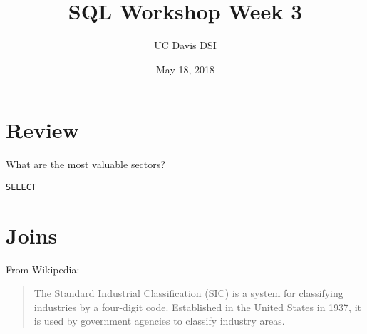 \documentclass[10pt]{exam}
\begin{document}
 
\title{SQL Workshop Week 3}
\author{UC Davis DSI}
\date{May 18, 2018}

\maketitle

\section{Review}

\begin{questions}

\question What are the most valuable sectors?

\begin{solution}
\begin{lstlisting}
SELECT
\end{lstlisting}
\end{solution}

\end{questions}
\section{Joins}

From Wikipedia:

    \begin{quote}
        The Standard Industrial Classification (SIC) is a system for
        classifying industries by a four-digit code. Established in the
        United States in 1937, it is used by government agencies to
        classify industry areas.
    \end{quote}
\end{document}
